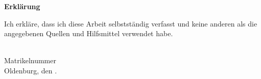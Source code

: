\newpage
\thispagestyle{empty}
\quad
\vspace{6.8cm}
\begin{center}
	\begin{Large}
		\textbf{Erklärung}
	\end{Large}
\end{center}

\noindent
Ich erkläre, dass ich diese Arbeit selbstständig verfasst und keine anderen als die angegebenen
Quellen und Hilfsmittel verwendet habe.

\vspace{3cm}
\noindent
\Name\\
Matrikelnummer \MatrNr\\
Oldenburg, den \the\day. \MONTH\ \the\year{}